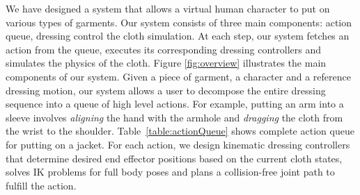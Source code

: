 We have designed a system that allows a virtual human character to put on various types of garments. Our system consists of three main components: action queue, dressing control the cloth simulation.
At each step, our system fetches an action from the queue,
executes its corresponding dressing controllers and simulates the physics of the cloth. Figure \ref{fig:overview} illustrates the main components of our system. 
Given a piece of garment, a character and a reference dressing motion, our system allows a user to decompose the entire
dressing sequence into a queue of high level actions. For example, putting an arm into a sleeve involves \emph{aligning} the hand with the armhole and
\emph{dragging} the cloth from the wrist to the shoulder. 
Table~\ref{table:actionQueue} shows complete action queue for putting on a jacket.
For each action, we design kinematic dressing controllers that determine desired end effector positions based on the current cloth states, solves IK problems for full body poses and plans a collision-free joint path to fulfill the action. 





